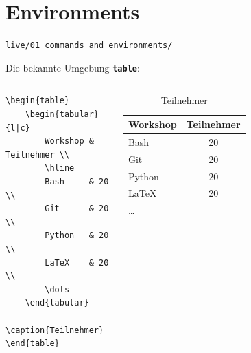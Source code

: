 \documentclass[14pt,aspectratio=169]{beamer}
\begin{document}

\section{Environments}
\begin{frame}
    \sectionpage
    \vspace{.5em}
    \large\faFolderOpen \normalsize \texttt{live/01_commands_and_environments/} 
\end{frame}

\begin{frame}[fragile]{\insertsection}
    
    Die bekannte Umgebung \textbf{\texttt{table}}: \vspace{1em}
    
    \begin{columns}
        
        \begin{verbatim}
\begin{table}
    \begin{tabular}{l|c}
        Workshop & Teilnehmer \\
        \hline
        Bash     & 20 \\
        Git      & 20 \\
        Python   & 20 \\
        LaTeX    & 20 \\
        \dots    
    \end{tabular}
    \caption{Teilnehmer}
\end{table}
        \end{verbatim}
        
        
        \begin{table}
            \begin{tabular}{l|c}
                Workshop & Teilnehmer \\
                \hline
                Bash     & 20 \\
                Git      & 20 \\
                Python   & 20 \\
                LaTeX    & 20 \\
                \dots    
            \end{tabular}
            \caption{Teilnehmer}
        \end{table}
    \end{columns}
    

    \note{}
\end{frame}
\end{document}
